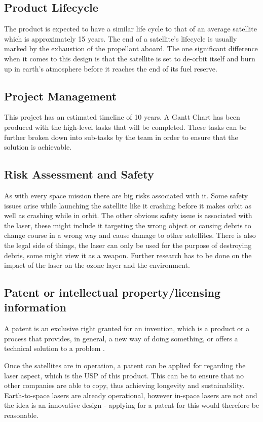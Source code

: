 \documentclass{article}
\begin{document}
\subsection{Product Lifecycle}
The product is expected to have a similar life cycle to that of an average satellite which is approximately 15 years. The end of a satellite’s lifecycle is usually marked by the exhaustion of the propellant aboard. The one significant difference when it comes to this design is that the satellite is set to de-orbit itself and burn up in earth’s atmosphere before it reaches the end of its fuel reserve.


\subsection{Project Management}
This project has an estimated timeline of 10 years. A Gantt Chart has been produced with the high-level tasks that will be completed. These tasks can be further broken down into sub-tasks by the team in order to ensure that the solution is achievable.

\subsection{Risk Assessment and Safety}
As with every space mission there are big risks associated with it. Some safety issues arise while launching the satellite like it crashing before it makes orbit as well as crashing while in orbit. The other obvious safety issue is associated with the laser, these might include it targeting the wrong object or causing debris to change course in a wrong way and cause damage to other satellites. There is also the legal side of things, the laser can only be used for the purpose of destroying debris, some might view it as a weapon. Further research has to be done on the impact of the laser on the ozone layer and the environment.

\subsection{Patent or intellectual property/licensing information}
A patent is an exclusive right granted for an invention, which is a product or a process that provides, in general, a new way of doing something, or offers a technical solution to a problem \cite{WIPO}.

Once the satellites are in operation, a patent can be applied for regarding the laser aspect, which is the USP of this product. This can be to ensure that no other companies are able to copy, thus achieving longevity and sustainability. 
Earth-to-space lasers are already operational, however in-space lasers are not and the idea is an innovative design - applying for a patent for this would therefore be reasonable.
\end{document}
